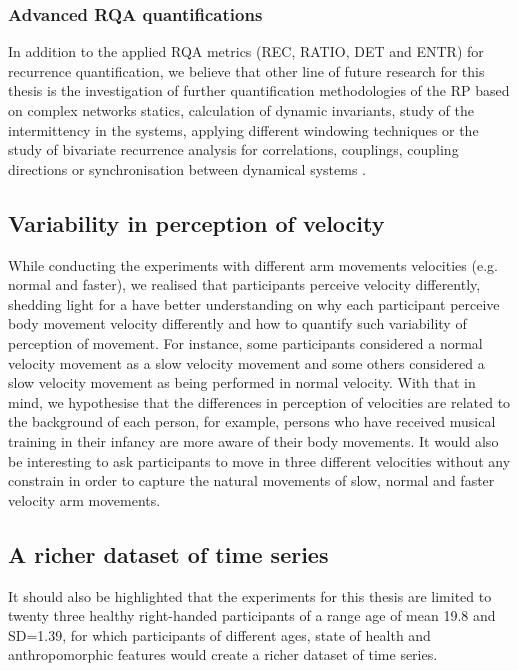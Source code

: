 \subsubsection{Advanced RQA quantifications}
In addition to the applied RQA metrics (REC, RATIO, DET and ENTR) for 
recurrence quantification, 
we believe that other line of future research for this thesis is the 
investigation of further quantification methodologies of the RP based 
on complex networks statics, calculation of dynamic invariants, 
study of the intermittency in the systems, applying different windowing 
techniques or the study of bivariate recurrence analysis for correlations, 
couplings, coupling directions or synchronisation between dynamical systems
\citep{marwan2007, marwan2015}.


\subsection{Variability in perception of velocity}
While conducting the experiments with different arm movements 
velocities (e.g. normal and faster), we realised that participants 
perceive velocity differently, shedding light for a have better 
understanding on why each participant perceive body movement velocity 
differently and how to quantify such variability of perception of movement.
For instance, some participants considered a normal velocity movement 
as a slow velocity movement and some others considered a 
slow velocity movement as being performed in normal velocity. 
With that in mind, we hypothesise that the differences in perception of 
velocities are related to the background of each person, for example,
persons who have received musical training in their infancy
are more aware of their body movements. %
It would also be interesting to ask participants to move in three 
different velocities without any constrain in order to capture 
the natural movements of slow, normal and faster velocity arm movements. 

\subsection{A richer dataset of time series}
It should also be highlighted that the experiments for this thesis are 
limited to twenty three healthy right-handed participants of a 
range age of mean 19.8 and SD=1.39, for which participants of 
different ages, state of health and anthropomorphic features 
would create a richer dataset of time series.



